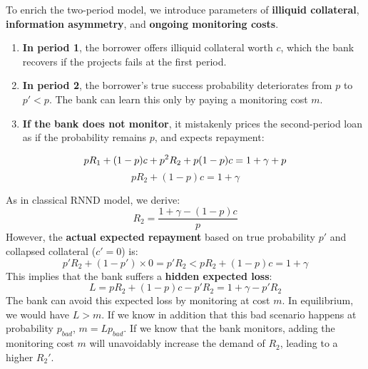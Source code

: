 To enrich the two-period model, we introduce parameters of \textbf{illiquid collateral}, \textbf{information asymmetry}, and \textbf{ongoing monitoring costs}.
\begin{enumerate}
    \item \textbf{In period 1}, the borrower offers illiquid collateral worth $c$, which the bank recovers if the projects fails at the first period.
    \item \textbf{In period 2}, the borrower's true success probability deteriorates from $p$ to $p' < p$. The bank can learn this only by paying a monitoring cost $m$.
    \item \textbf{If the bank does not monitor}, it mistakenly prices the second-period loan as if the probability remains $p$, and expects repayment:
\end{enumerate}
\begin{equation*}
    pR_1 + (1 - p)c + p^2 R_2 + p(1 - p)c = 1 + \gamma + p \\
\end{equation*}
\begin{equation*}
    pR_2 + (1 - p)c= 1 + \gamma
\end{equation*}

As in classical RNND model, we derive:
\begin{equation*}
    R_2 = \frac{1 + \gamma - (1 - p)c}{p}
\end{equation*}
However, the \textbf{actual expected repayment} based on true probability $p'$ and collapsed collateral ($c' = 0$) is:
\begin{equation*}
    p' R_2 + (1 - p')\times 0 = p' R_2 < p R_2 + (1 - p)c = 1 + \gamma
\end{equation*}
This implies that the bank suffers a \textbf{hidden expected loss}:
\begin{equation*}
    L = p R_2 + (1 - p)c - p' R_2 = 1 + \gamma - p' R_2
\end{equation*}
The bank can avoid this expected loss by monitoring at cost $m$. In equilibrium, we would have $L > m$. If we know in addition that this bad scenario happens at probability $p_{bad}$, $m = L p_{bad}$.
If we know that the bank monitors, 
adding the monitoring cost $m$ will unavoidably increase the demand of $R_2$, leading to a higher $R_2'$.

